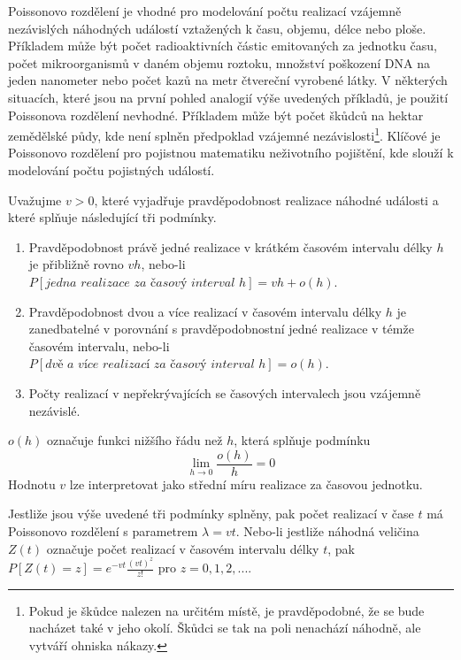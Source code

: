 Poissonovo rozdělení je vhodné pro modelování počtu realizací vzájemně nezávislých náhodných událostí vztažených k času, objemu, délce nebo ploše. Příkladem může být počet radioaktivních částic emitovaných za jednotku času, počet mikroorganismů v daném objemu roztoku, množství poškození DNA na jeden nanometer nebo počet kazů na metr čtvereční vyrobené látky. V některých situacích, které jsou na první pohled analogií výše uvedených příkladů, je použití Poissonova rozdělení nevhodné. Příkladem může být počet škůdců na hektar zemědělské půdy, kde není splněn předpoklad vzájemné nezávislosti\footnote{Pokud je škůdce nalezen na určitém místě, je pravděpodobné, že se bude nacházet také v jeho okolí. Škůdci se tak na poli nenachází náhodně, ale vytváří ohniska nákazy.}. Klíčové je Poissonovo rozdělení pro pojistnou matematiku neživotního pojištění, kde slouží k modelování počtu pojistných událostí.

Uvažujme $v > 0$, které vyjadřuje pravděpodobnost realizace náhodné události a které splňuje následující tři podmínky.
\begin{enumerate}
\item Pravděpodobnost právě jedné realizace v krátkém časovém intervalu délky $h$ je přibližně rovno $vh$, nebo-li $P[\textit{jedna realizace za časový interval } h] = vh + o(h)$.
\item Pravděpodobnost dvou a více realizací v časovém intervalu délky $h$ je zanedbatelné v porovnání s pravděpodobnostní jedné realizace v témže časovém intervalu, nebo-li $P[\textit{dvě a více realizací za časový interval } h] = o(h)$.
\item Počty realizací v nepřekrývajících se časových intervalech jsou vzájemně nezávislé. 
\end{enumerate}
$o(h)$ označuje funkci nižšího řádu než $h$, která splňuje podmínku
\begin{equation*}
\lim_{h \rightarrow 0} \frac{o(h)}{h} = 0
\end{equation*}
Hodnotu $v$ lze interpretovat jako střední míru realizace za časovou jednotku.

\begin{theorem}
Jestliže jsou výše uvedené tři podmínky splněny, pak počet realizací v čase $t$ má Poissonovo rozdělení s parametrem $\lambda = v t$. Nebo-li jestliže náhodná veličina $Z(t)$ označuje počet realizací v časovém intervalu délky $t$, pak $P[Z(t) = z] = e^{-vt}\frac{(vt)^z}{z!}$ pro $z = 0, 1, 2, ...$.
\end{theorem}

